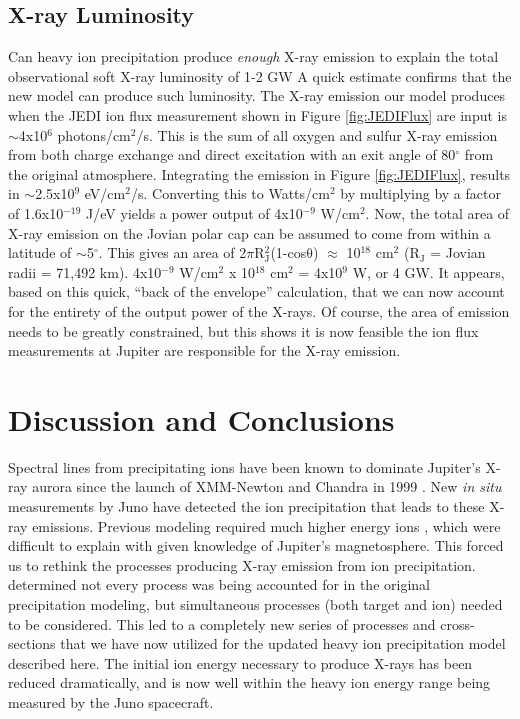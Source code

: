 \documentclass[draft]{agujournal2018}
\begin{document}
\subsection{X-ray Luminosity}

Can heavy ion precipitation produce \textit{enough} X-ray emission to explain the total observational soft X-ray luminosity of 1-2 GW \citep{elsner2005,gladstone2002}
A quick estimate confirms that the new model can produce such luminosity.
The X-ray emission our model produces when the JEDI ion flux measurement shown in Figure \ref{fig:JEDIFlux} are input is $\sim$4x10$^6$ photons/cm$^2$/s.
This is the sum of all oxygen and sulfur X-ray emission from both charge exchange and direct excitation with an exit angle of 80$^{\circ}$ from the original atmosphere.
Integrating the emission in Figure \ref{fig:JEDIFlux}, results in $\sim$2.5x10$^9$ eV/cm$^2$/s.
Converting this to Watts/cm$^2$ by multiplying by a factor of 1.6x10$^{-19}$ J/eV yields a power output of 4x10$^{-9}$ W/cm$^2$.
Now, the total area of X-ray emission on the Jovian polar cap can be assumed to come from within a latitude of $\sim$5$^{\circ}$.
This gives an area of 2$\pi$R$_{\mathrm{J}}^2$(1-cos$\mathrm{\theta}$) $\approx$ 10$^{18}$ cm$^2$ (R$_{\mathrm{J}}$ = Jovian radii = 71,492 km).
4x10$^{-9}$ W/cm$^2$ x 10$^{18}$ cm$^2$ = 4x10$^9$ W, or 4 GW.
It appears, based on this quick, ``back of the envelope'' calculation, that we can now account for the entirety of the output power of the X-rays.
Of course, the area of emission needs to be greatly constrained, but this shows it is now feasible the ion flux measurements at Jupiter are responsible for the X-ray emission.

\section{Discussion and Conclusions}

Spectral lines from precipitating ions have been known to dominate Jupiter's X-ray aurora since the launch of XMM-Newton and Chandra in 1999 \citep{branduardi2004,elsner2005}.
New \textit{in situ} measurements by Juno have detected the ion precipitation that leads to these X-ray emissions.
Previous modeling required much higher energy ions \citep{cravens1995,ozak2010,ozak2013,houston2018}, which were difficult to explain with given knowledge of Jupiter's magnetosphere.
This forced us to rethink the processes producing X-ray emission from ion precipitation.
\citet{schultz2019} determined not every process was being accounted for in the original precipitation modeling, but simultaneous processes (both target and ion) needed to be considered.
This led to a completely new series of processes and cross-sections that we have now utilized for the updated heavy ion precipitation model described here.
The initial ion energy necessary to produce X-rays has been reduced dramatically, and is now well within the heavy ion energy range being measured by the Juno spacecraft.
\end{document}
